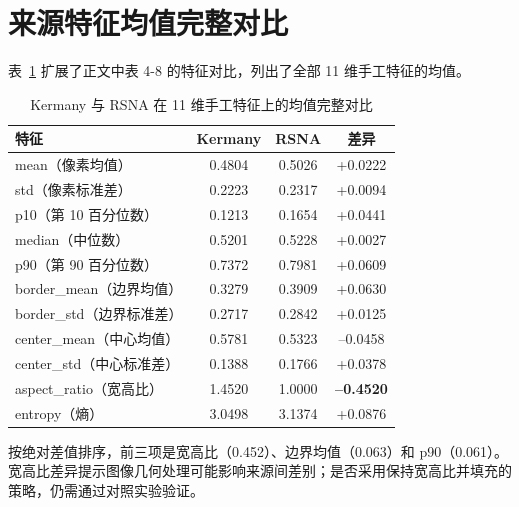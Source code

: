 \documentclass[12pt,a4paper,UTF8,openany]{ctexbook}
\begin{document}
\section{来源特征均值完整对比}

表~\ref{tab:supp_features} 扩展了正文中表 4-8 的特征对比，列出了全部 11 维手工特征的均值。

\begin{table}[htbp]
\centering
\caption{Kermany 与 RSNA 在 11 维手工特征上的均值完整对比}
\label{tab:supp_features}
\renewcommand{\arraystretch}{1.3}
\begin{tabular}{lccc}
\toprule
\textbf{特征} & \textbf{Kermany} & \textbf{RSNA} & \textbf{差异} \\
\midrule
mean（像素均值）          & 0.4804 & 0.5026 & +0.0222 \\
std（像素标准差）         & 0.2223 & 0.2317 & +0.0094 \\
p10（第 10 百分位数）     & 0.1213 & 0.1654 & +0.0441 \\
median（中位数）          & 0.5201 & 0.5228 & +0.0027 \\
p90（第 90 百分位数）     & 0.7372 & 0.7981 & +0.0609 \\
border\_mean（边界均值）   & 0.3279 & 0.3909 & +0.0630 \\
border\_std（边界标准差）  & 0.2717 & 0.2842 & +0.0125 \\
center\_mean（中心均值）  & 0.5781 & 0.5323 & --0.0458 \\
center\_std（中心标准差）  & 0.1388 & 0.1766 & +0.0378 \\
aspect\_ratio（宽高比）   & 1.4520 & 1.0000 & \textbf{--0.4520} \\
entropy（熵）             & 3.0498 & 3.1374 & +0.0876 \\
\bottomrule
\end{tabular}
\end{table}

按绝对差值排序，前三项是宽高比（0.452）、边界均值（0.063）和 p90（0.061）。宽高比差异提示图像几何处理可能影响来源间差别；是否采用保持宽高比并填充的策略，仍需通过对照实验验证。
\end{document}
